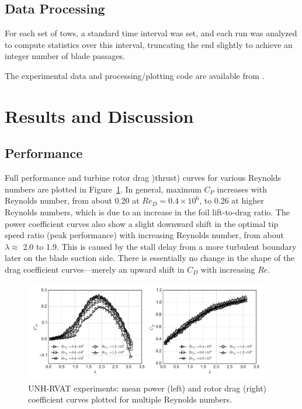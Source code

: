 \documentclass[energies,article,accept,moreauthors,pdftex,12pt,a4paper]{mdpi}
\begin{document}

\subsection{Data Processing}

For each set of tows, a standard time interval was set, and each run was
analyzed to compute statistics over this interval, truncating the end slightly
to achieve an integer number of blade passages.

The experimental data and processing/plotting code are available from
\cite{Bachant2015-RVAT-Re-dep-data}.


\section{Results and Discussion}


\subsection{Performance}

Full performance and turbine rotor drag )thrust) curves for various Reynolds 
numbers are plotted in Figure~\ref{fig:perf-curves}. 
In general, maximum $C_P$ increases with Reynolds number, from about 0.20 at 
$Re_D=0.4 \times 10^6$, to 0.26 at higher Reynolds numbers, which is due to an
increase in the foil lift-to-drag ratio. The power coefficient curves also show
a slight downward shift in the optimal tip speed ratio (peak performance) with 
increasing Reynolds 
number, from about $\lambda \approx$ 2.0 to 1.9.
This is caused by the stall delay from a more turbulent boundary later on the
blade suction side.
There is essentially no change in the shape of the
drag coefficient curves---merely an upward shift in $C_D$ with increasing $Re$.

\begin{figure}[ht]
\includegraphics[width=0.95\textwidth]{figures/perf_curves}
\caption{UNH-RVAT experiments: mean power (left) and rotor drag (right) 
coefficient curves plotted for multiple Reynolds numbers.}
\label{fig:perf-curves}
\end{figure}
\end{document}
